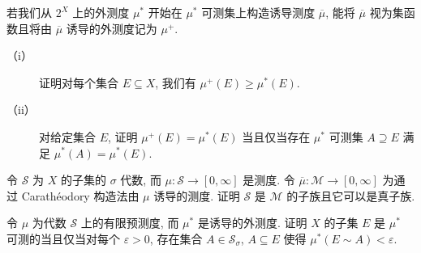 \documentclass[../../main.tex]{subfiles}
\begin{document}
\begin{exercise}\label{exercise:ch17-34}
若我们从 $2^{X}$ 上的外测度 $\mu^*$ 开始在 $\mu^*$ 可测集上构造诱导测度 $\overline{\mu}$, 能将 $\overline{\mu}$ 视为集函数且将由 $\overline{\mu}$ 诱导的外测度记为 $\mu^{+}$.
\begin{description}
\item[（i）] 证明对每个集合 $E\subseteq X$, 我们有 $\mu^{+}(E)\geqslant\mu^*(E)$.
\item[（ii）] 对给定集合 $E$, 证明 $\mu^{+}(E)=\mu^*(E)$ 当且仅当存在 $\mu^*$ 可测集 $A\supseteq E$ 满足 $\mu^*(A)=\mu^*(E)$.
\end{description}
\end{exercise}

\begin{exercise}\label{exercise:ch17-35}
令 $\mathcal{S}$ 为 $X$ 的子集的 $\sigma$ 代数, 而 $\mu:\mathcal{S}\to[0,\infty]$ 是测度. 令 $\overline{\mu}:\mathcal{M}\to[0,\infty]$ 为通过 Carath\'eodory 构造法由 $\mu$ 诱导的测度. 证明 $\mathcal{S}$ 是 $\mathcal{M}$ 的子族且它可以是真子族.
\end{exercise}

\begin{exercise}\label{exercise:ch17-36}
令 $\mu$ 为代数 $\mathcal{S}$ 上的有限预测度, 而 $\mu^*$ 是诱导的外测度. 证明 $X$ 的子集 $E$ 是 $\mu^*$ 可测的当且仅当对每个 $\varepsilon>0$, 存在集合 $A\in\mathcal{S}_{\sigma}$, $A\subseteq E$ 使得 $\mu^*(E\sim A)<\varepsilon$.
\end{exercise}
\end{document}
